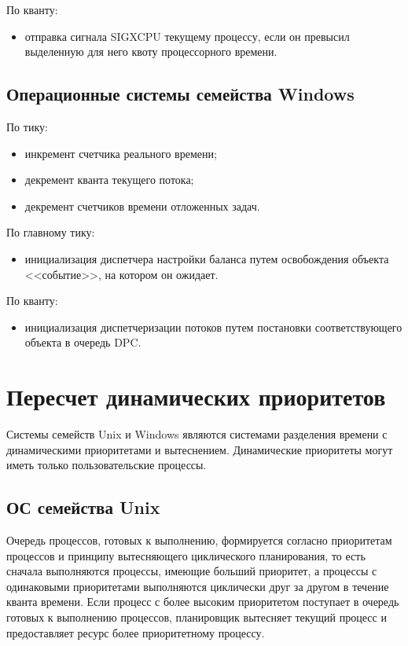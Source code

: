 По кванту:
\begin{itemize}
        \item отправка сигнала SIGXCPU текущему процессу, если он превысил выделенную для него квоту процессорного времени.
\end{itemize}

\section{Операционные системы семейства Windows}

По тику:

\begin{itemize}
	\item инкремент счетчика реального времени;
	\item декремент кванта текущего потока;
	\item декремент счетчиков времени отложенных задач.
\end{itemize}

По главному тику:

\begin{itemize}
	\item инициализация диспетчера настройки баланса путем освобождения объекта <<событие>>, на котором он ожидает.
\end{itemize}

По кванту:

\begin{itemize}
	\item инициализация диспетчеризации потоков путем постановки соответствующего объекта в очередь DPC.
\end{itemize}


\chapter{Пересчет динамических приоритетов}

Системы семейств Unix и Windows являются системами разделения времени с динамическими приоритетами и вытеснением. Динамические приоритеты могут иметь только пользовательские процессы.

\section{ОС семейства Unix}

Очередь процессов, готовых к выполнению, формируется согласно приоритетам процессов и принципу вытесняющего циклического планирования, то есть сначала выполняются процессы, имеющие больший приоритет, а процессы с одинаковыми приоритетами выполняются циклически друг за другом в течение кванта времени. Если процесс с более высоким приоритетом поступает в очередь готовых к выполнению процессов, планировщик вытесняет текущий процесс и предоставляет ресурс более приоритетному процессу.


